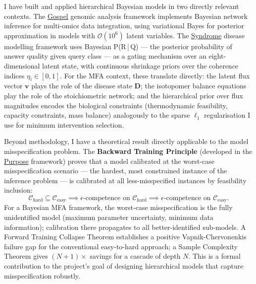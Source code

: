 \documentclass[12pt,a4paper]{article}
\begin{document}
I have built and applied hierarchical Bayesian models in two directly relevant
contexts. The \href{https://github.com/fullscreen-triangle/gospel}{Gospel}
genomic analysis framework implements Bayesian network inference for
multi-omics data integration, using variational Bayes for posterior
approximation in models with $\mathcal{O}(10^6)$ latent variables.
The \href{https://github.com/fullscreen-triangle/syndrome}{Syndrome} disease
modelling framework uses Bayesian P(R\,|\,Q) --- the posterior probability of
answer quality given query class --- as a gating mechanism over an
eight-dimensional latent state, with continuous shrinkage priors over the
coherence indices $\eta_i \in [0,1]$.
For the MFA context, these translate directly: the latent flux vector
$\mathbf{v}$ plays the role of the disease state $\mathbf{D}$; the
isotopomer balance equations play the role of the stoichiometric network;
and the hierarchical prior over flux magnitudes encodes the biological
constraints (thermodynamic feasibility, capacity constraints, mass balance)
analogously to the sparse $\ell_1$ regularisation I use for minimum
intervention selection.

Beyond methodology, I have a theoretical result directly applicable to the
model misspecification problem. The \textbf{Backward Training Principle}
(developed in the \href{https://github.com/fullscreen-triangle/purpose}{Purpose}
framework) proves that a model calibrated at the worst-case misspecification
scenario --- the hardest, most constrained instance of the inference problem
--- is calibrated at all less-misspecified instances by feasibility inclusion:
\[
\mathcal{C}_{\mathrm{hard}} \subseteq \mathcal{C}_{\mathrm{easy}}
\implies
\epsilon\text{-competence on } \mathcal{C}_{\mathrm{hard}}
\implies
\epsilon\text{-competence on } \mathcal{C}_{\mathrm{easy}}.
\]
For a Bayesian MFA framework, the worst-case misspecification is the fully
unidentified model (maximum parameter uncertainty, minimum data information);
calibration there propagates to all better-identified sub-models.
A Forward Training Collapse Theorem establishes a positive Vapnik-Chervonenkis
failure gap for the conventional easy-to-hard approach; a Sample Complexity
Theorem gives $(N{+}1)\times$ savings for a cascade of depth $N$.
This is a formal contribution to the project's goal of designing hierarchical
models that capture misspecification robustly.
\end{document}
